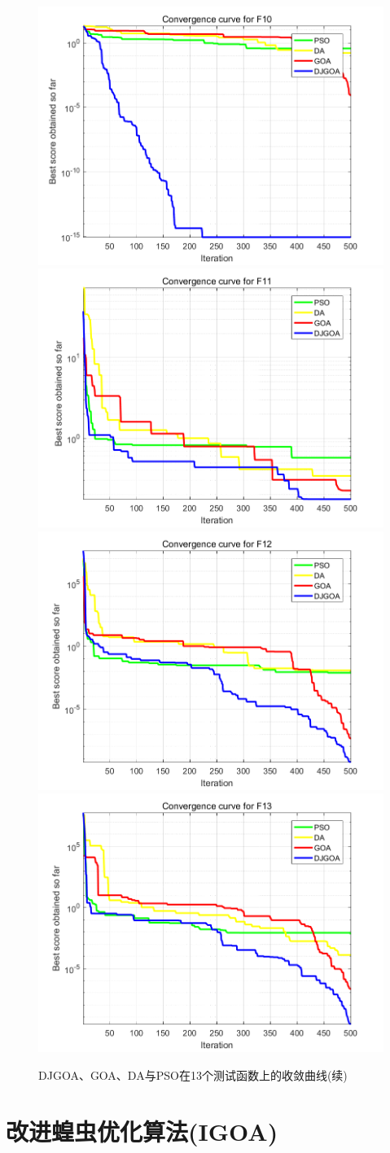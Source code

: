 \begin{figure}[!htbp]
    \includegraphics[width=.5\linewidth]{DJGOA_F10}\hfill\\[0.5cm]
    \centering
    \includegraphics[width=.5\linewidth]{DJGOA_F11}\hfill
    \includegraphics[width=.5\linewidth]{DJGOA_F12}\hfill\\[0.5cm]
    \centering
    \includegraphics[width=.5\linewidth]{DJGOA_F13}\hfill\\[0.5cm]
    \caption{DJGOA、GOA、DA与PSO在13个测试函数上的收敛曲线(续)}
\end{figure}

\section{改进蝗虫优化算法(IGOA)}\label{sec:task_scheduling_IGOA}

